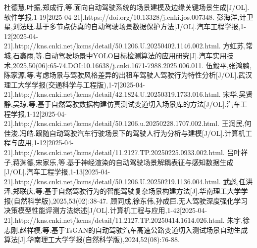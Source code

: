 \documentclass{article}
\begin{document}
\begin{thebibliography}{99}
	杜德慧,叶振,郑成行,等.面向自动驾驶系统的场景建模及边缘关键场景生成[J/OL].软件学报,1-19[2025-04-21].https://doi.org/10.13328/j.cnki.jos.007348.
	彭海洋,计卫星,刘法旺.基于多节点仿真的自动驾驶场景数据保护方法[J/OL].汽车工程学报,1-12[2025-04-21].http://kns.cnki.net/kcms/detail/50.1206.U.20250402.1146.002.html.
	方虹苏,常城,石鑫雨,等.自动驾驶场景中YOLO目标检测算法的应用研究[J].汽车实用技术,2025,50(06):65-74.DOI:10.16638/j.cnki.1671-7988.2025.006.011.
	伍毅平,张鸿鹏,陈家源,等.考虑场景与驾驶风格差异的出租车驾驶人驾驶行为特性分析[J/OL].武汉理工大学学报(交通科学与工程版),1-7[2025-04-21].http://kns.cnki.net/kcms/detail/42.1824.U.20250319.1733.016.html.
	宋华,吴贤静,吴琼,等.基于自然驾驶数据构建仿真测试变道切入场景库的方法[J/OL].汽车工程学报,1-12[2025-04-21].http://kns.cnki.net/kcms/detail/50.1206.u.20250228.1707.002.html.
	王润民,何佳浚,冯皓.跟随自动驾驶汽车行驶场景下的驾驶人行为分析与建模[J/OL].计算机工程与应用,1-12[2025-04-21].http://kns.cnki.net/kcms/detail/11.2127.TP.20250225.0933.002.html.
	吕叶祥子,蒋渊德,宋家乐,等.基于神经渲染的自动驾驶场景解耦表征与感知数据生成[J/OL].汽车工程学报,1-13[2025-04-21].http://kns.cnki.net/kcms/detail/50.1206.U.20250219.1136.004.html.
	武彪,任洪泽,郑联庆,等.基于自然驾驶行为的智能驾驶复杂场景构建方法[J].华南理工大学学报(自然科学版),2025,53(02):38-47.
	顾同成,徐东伟,孙成巨.无人驾驶深度强化学习决策模型性能评测方法综述[J/OL].计算机工程与应用,1-42[2025-04-21].http://kns.cnki.net/kcms/detail/11.2127.TP.20250414.1614.026.html.
	朱宇,徐志刚,赵祥模,等.基于TsGAN的自动驾驶汽车高速公路变道切入测试场景自动生成算法[J].华南理工大学学报(自然科学版),2024,52(08):76-88.

\end{thebibliography}
\end{document}
